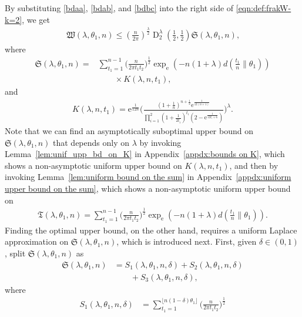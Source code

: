 \documentclass[journal, 10pt]{IEEEtran}
\newcommand{\rme}{\mathrm{e}}
\newcommand{\mfrakS}{\mathfrak{S}}
\newcommand{\mfrakT}{\mathfrak{T}}
\newcommand{\mfrakW}{\mathfrak{W}}
\theoremstyle{plain}
\theoremstyle{plain}
\theoremstyle{plain}
\theoremstyle{plain}
\newcommand{\opD}{\operatorname{D}}
\begin{document}
\begin{IEEEproof}
By substituting \eqref{bdaa}, \eqref{bdab}, and \eqref{bdbc} into the right side of \eqref{eqn:def:frakW-k=2}, we get
\begin{align}
\mfrakW(\lambda, \theta_1, n) \le 
\left( \frac{n}{2\pi}  \right)^\frac{\lambda}{2} \opD_2^\lambda\left(\tfrac12, \tfrac12\right)\mfrakS (\lambda, \theta_1, n) \text{,} \label{k=2_upper_bound_2}
\end{align}
where
\begin{align}
\mfrakS(\lambda, \theta_1, n)=
&\sum_{t_1=1}^{n-1} \Big(\frac{n}{2\pi t_1t_2} \Big)^\frac12 \exp_\rme(-n(1+\lambda) d(\tfrac{t_1}{n}\|\theta_1)) \nonumber \\ 
&\qquad \times K(\lambda, n, t_1)\text{,} \label{eqn:def:frakS-k=2}
\end{align}
and
\begin{align}
K(\lambda, n, t_1)=\rme^\frac{1}{12n} \Bigg( \frac{( 1+\frac{1}{n} )^{n+\frac{1}{2}}\rme^{\frac{1}{12(n+1)}}}{\prod_{i=1}^2 ( 1+\frac{1}{2t_i})^{t_i}( 2-\rme^{\frac{1}{12t_i+6}})}    \Bigg)^\lambda\text{.} \label{eqn:def:K-when_k=2}
\end{align}
Note that we can find an asymptotically suboptimal upper bound on $\mfrakS (\lambda, \theta_1, n)$ that depends only on $\lambda $ by invoking Lemma~\ref{lem:unif_upp_bd_on_K} in Appendix~\ref{appdx:bounds on K}, which shows a non-asymptotic uniform upper bound on $K(\lambda, n, t_1)$, and then by invoking Lemma~\ref{lem:uniform bound on the sum} in Appendix~\ref{appdx:uniform upper bound on the sum}, which shows a non-asymptotic uniform upper bound on
\begin{align}
\mfrakT(\lambda, \theta_1, n)=
\sum_{t_1=1}^{n-1}  \Big(\frac{n}{2\pi t_1t_2} \Big)^\frac12 \exp_\rme(-n(1+\lambda) d(\tfrac{t_1}{n}\|\theta_1))\text{.} \label{eqn:def:mfrakT-k=2}
\end{align}
Finding the optimal upper bound, on the other hand, requires a uniform Laplace approximation on $\mfrakS(\lambda, \theta_1, n)$, which is introduced next. First, given $\delta \in (0,1)$, split $\mfrakS(\lambda, \theta_1, n) $ as
\begin{align}
\mfrakS(\lambda, \theta_1, n)&= S_1(\lambda, \theta_1, n, \delta) +S_2(\lambda, \theta_1, n, \delta) \label{eqn:key_splitting} \\ 
&\qquad +S_3(\lambda, \theta_1, n, \delta)\text{,}  \nonumber
\end{align}
where  
\begin{align}
S_1(\lambda, \theta_1, n, \delta)&= \sum_{t_1=1}^{\lfloor n(1-\delta)\theta_1 \rfloor}   \Big(\frac{n}{2\pi t_1t_2} \Big)^\frac12 \label{eqn:k=2_sum_S1} \\ & \nonumber

\end{align}
\end{IEEEproof}
\end{document}
